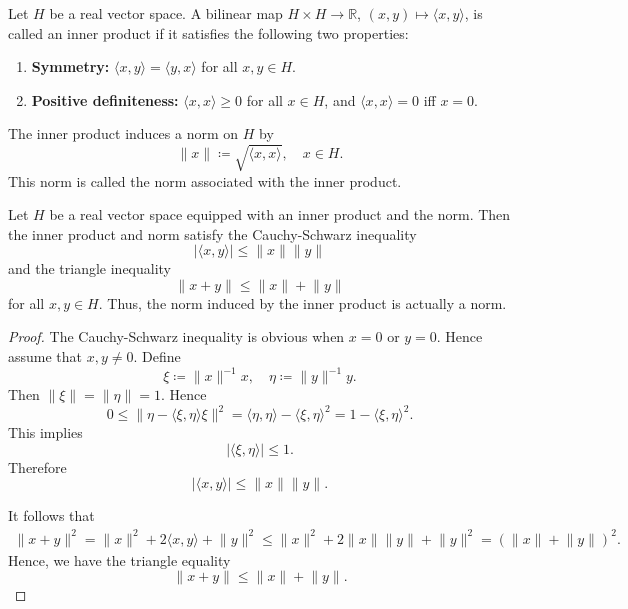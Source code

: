 \begin{definition} 
    Let \(H\) be a real vector space. A bilinear map \(H \times H \to \mathbb{R}\), \((x, y) \mapsto \langle x, y \rangle \), is called an inner product if it satisfies the following two properties: 
    \begin{enumerate}
        \item \textbf{Symmetry:} \(\langle x, y \rangle = \langle y, x \rangle  \) for all \(x, y \in H\). 
        \item \textbf{Positive definiteness:} \(\langle x, x \rangle \ge 0 \) for all \(x \in H\), and \(\langle x, x \rangle = 0 \) iff \(x = 0\).        
    \end{enumerate}   
\end{definition}

\begin{remark}
    The inner product induces a norm on \(H\) by 
    \[
        \lVert x \rVert \coloneqq \sqrt{\langle x, x \rangle }, \quad x \in H.  
    \] 
    This norm is called the norm associated with the inner product.
\end{remark}

\begin{lemma}
    Let \(H\) be a real vector space equipped with an inner product and the norm. Then the inner product and norm satisfy the Cauchy-Schwarz inequality 
    \[
        \vert \langle x, y \rangle  \vert \le \lVert x \rVert \lVert y \rVert   
    \] 
    and the triangle inequality 
    \[
        \lVert x + y \rVert \le \lVert x \rVert + \lVert y \rVert   
    \]
    for all \(x, y \in H\). Thus, the norm induced by the inner product is actually a norm. 
\end{lemma}

\begin{proof}
    The Cauchy-Schwarz inequality is obvious when \(x = 0\) or \(y = 0\). Hence assume that \(x, y \neq 0\). Define
    \[
        \xi \coloneqq \lVert x \rVert^{-1} x, \quad \eta \coloneqq  \lVert y \rVert^{-1} y.   
    \]   
    Then \(\lVert \xi \rVert = \lVert \eta  \rVert = 1  \). Hence 
    \[
        0 \le \lVert \eta - \langle \xi , \eta  \rangle \xi   \rVert^2 = \langle \eta , \eta  \rangle - \langle \xi, \eta \rangle^2 = 1 - \langle \xi , \eta  \rangle^2.  
    \] 
    This implies 
    \[
        \vert \langle \xi , \eta  \rangle \vert  \le 1. 
    \]
    Therefore 
    \[
        \vert \langle x, y \rangle  \vert \le \lVert x \rVert \lVert y \rVert.   
    \]

    It follows that 
    \begin{align*}
        \lVert x + y \rVert^2 = \lVert x \rVert^2 + 2 \langle x, y \rangle + \lVert y \rVert^2 \le \lVert x \rVert^2 + 2 \lVert x \rVert \lVert y \rVert + \lVert y \rVert^2 = \left( \lVert x \rVert + \lVert y \rVert   \right)^2.         
    \end{align*}
    Hence, we have the triangle equality 
    \[
        \lVert x + y \rVert \le \lVert x \rVert + \lVert y \rVert.   
    \]
\end{proof}

